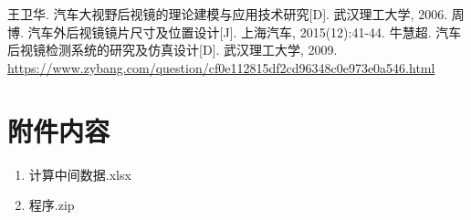\documentclass[bwprint]{cumcmthesis}
\begin{document}
\begin{thebibliography}{9}%
  王卫华. 汽车大视野后视镜的理论建模与应用技术研究[D]. 武汉理工大学, 2006.
  周博. 汽车外后视镜镜片尺寸及位置设计[J]. 上海汽车, 2015(12):41-44.
  牛慧超. 汽车后视镜检测系统的研究及仿真设计[D]. 武汉理工大学, 2009.
 \url{https://www.zybang.com/question/cf0e112815df2cd96348c0e973e0a546.html}
\end{thebibliography}

\newpage
\appendix

\section{附件内容}
\begin{enumerate}
	\item 计算中间数据.xlsx
	\item 程序.zip
\end{enumerate}
\end{document}
